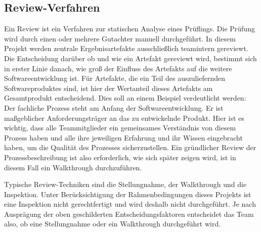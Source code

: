 \documentclass[a4paper,11pt,listof=numbered,glossary=totoc,parskip=half,toc=bib]{scrreprt}
\begin{document}
\subsection{Review-Verfahren}	
Ein Review ist ein Verfahren zur statischen Analyse eines Prüflings. Die Prüfung wird durch einen oder mehrere Gutachter manuell durchgeführt. In diesem Projekt werden zentrale Ergebnisartefakte ausschließlich teamintern gereviewt. Die Entscheidung darüber ob und wie ein Artefakt gereviewt wird, bestimmt sich in erster Linie danach, wie groß der Einfluss des Artefakts auf die weitere Softwareentwicklung ist. Für Artefakte, die ein Teil des auszuliefernden Softwareproduktes sind, ist hier der Wertanteil dieses Artefakts am Gesamtprodukt entscheidend. Dies soll an einem Beispiel verdeutlicht werden: Der fachliche Prozess steht am Anfang der Softwareentwicklung. Er ist maßgeblicher Anforderungsträger an das zu entwickelnde Produkt. Hier ist es wichtig, dass alle Teammitglieder ein gemeinsames Verständnis von diesem Prozess haben und alle ihre jeweiligen Erfahrung und ihr Wissen eingebracht haben, um die Qualität des Prozesses sicherzustellen. Ein gründlicher Review der Prozessbeschreibung ist also erforderlich, wie sich später zeigen wird, ist in diesem Fall ein Walkthrough durchzuführen. 

Typische Review-Techniken sind die Stellungnahme, der Walkthrough und die Inspektion. Unter Berücksichtigung der Rahmenbedingungen dieses Projekts ist eine Inspektion nicht gerechtfertigt und wird deshalb nicht durchgeführt. Je nach Ausprägung der oben geschilderten Entscheidungsfaktoren entscheidet das Team also, ob eine Stellungnahme oder ein Walkthrough durchgeführt wird.
\end{document}
